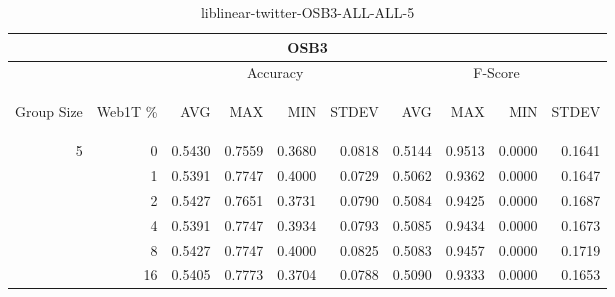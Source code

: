 \begin{center}
\begin{table}[htbp]
\begin{tabular}{ | r | r | r | r | r | r | r | r | r | r |}
\hline
\multicolumn{10}{|c|}{OSB3}\\
\hline
 & & \multicolumn{4}{|c|}{Accuracy} & \multicolumn{4}{|c|}{F-Score}\\ \cline{3-10}
\begin{sideways}Group Size\end{sideways} & \begin{sideways}Web1T \%\end{sideways} & \begin{sideways}AVG\end{sideways} & \begin{sideways}MAX\end{sideways} & \begin{sideways}MIN\end{sideways} & \begin{sideways}STDEV\end{sideways} & \begin{sideways}AVG\end{sideways} & \begin{sideways}MAX\end{sideways} & \begin{sideways}MIN\end{sideways} & \begin{sideways}STDEV\end{sideways}\\
\hline
\multirow{6}{*}{5}
 & 0 & 0.5430 & 0.7559 & 0.3680 & 0.0818 & 0.5144 & 0.9513 & 0.0000 & 0.1641\\ \cline{2-10}
 & 1 & 0.5391 & 0.7747 & 0.4000 & 0.0729 & 0.5062 & 0.9362 & 0.0000 & 0.1647\\ \cline{2-10}
 & 2 & 0.5427 & 0.7651 & 0.3731 & 0.0790 & 0.5084 & 0.9425 & 0.0000 & 0.1687\\ \cline{2-10}
 & 4 & 0.5391 & 0.7747 & 0.3934 & 0.0793 & 0.5085 & 0.9434 & 0.0000 & 0.1673\\ \cline{2-10}
 & 8 & 0.5427 & 0.7747 & 0.4000 & 0.0825 & 0.5083 & 0.9457 & 0.0000 & 0.1719\\ \cline{2-10}
 & 16 & 0.5405 & 0.7773 & 0.3704 & 0.0788 & 0.5090 & 0.9333 & 0.0000 & 0.1653\\ \cline{2-10}
\hline
\end{tabular}
\caption{liblinear-twitter-OSB3-ALL-ALL-5}
\end{table}
\end{center}


